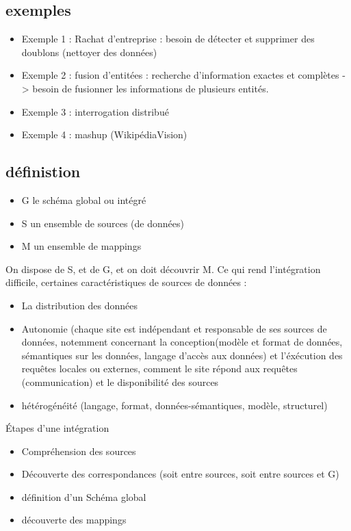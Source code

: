 \subsection{exemples}
\begin{itemize}
\item Exemple 1 : Rachat d'entreprise : besoin de détecter et supprimer des doublons (nettoyer des données)
\item Exemple 2 : fusion d'entitées : recherche d'information exactes et complètes -> besoin de fusionner les informations de plusieurs entités.
\item Exemple 3 : interrogation distribué
\item Exemple 4 : mashup (WikipédiaVision)
\end{itemize}

\subsection{définistion}
\begin{itemize}
\item G le schéma global ou intégré
\item S un ensemble de sources (de données)
\item M un ensemble de mappings
\end{itemize}

On dispose de S, et de G, et on doit découvrir M.
\vskip 1cm
Ce qui rend l'intégration difficile, certaines caractéristiques de sources de données :
\begin{itemize}
\item La distribution des données
\item Autonomie (chaque site est indépendant et responsable de ses sources de données, notemment concernant la conception(modèle et format de données, sémantiques sur les données, langage d'accès aux données) et l'éxécution des requêtes locales ou externes, comment le site répond aux requêtes (communication) et le disponibilité des sources
\item hétérogénéité (langage, format, données-sémantiques, modèle, structurel)

\end{itemize}

Étapes d'une intégration 
\begin{itemize}
\item Compréhension des sources
\item Découverte des correspondances (soit entre sources, soit entre sources et G)
\item définition d'un Schéma global
\item découverte des mappings
\end{itemize}

